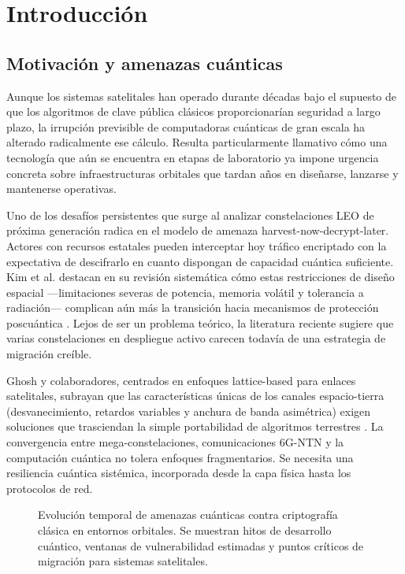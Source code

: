\section{Introducción}

\subsection{Motivación y amenazas cuánticas}

Aunque los sistemas satelitales han operado durante décadas bajo el supuesto de que los algoritmos de clave pública clásicos proporcionarían seguridad a largo plazo, la irrupción previsible de computadoras cuánticas de gran escala ha alterado radicalmente ese cálculo. Resulta particularmente llamativo cómo una tecnología que aún se encuentra en etapas de laboratorio ya impone urgencia concreta sobre infraestructuras orbitales que tardan años en diseñarse, lanzarse y mantenerse operativas.

Uno de los desafíos persistentes que surge al analizar constelaciones LEO de próxima generación radica en el modelo de amenaza harvest-now-decrypt-later. Actores con recursos estatales pueden interceptar hoy tráfico encriptado con la expectativa de descifrarlo en cuanto dispongan de capacidad cuántica suficiente. Kim et al. destacan en su revisión sistemática cómo estas restricciones de diseño espacial —limitaciones severas de potencia, memoria volátil y tolerancia a radiación— complican aún más la transición hacia mecanismos de protección poscuántica \cite{Kim2026}. Lejos de ser un problema teórico, la literatura reciente sugiere que varias constelaciones en despliegue activo carecen todavía de una estrategia de migración creíble.

Ghosh y colaboradores, centrados en enfoques lattice-based para enlaces satelitales, subrayan que las características únicas de los canales espacio-tierra (desvanecimiento, retardos variables y anchura de banda asimétrica) exigen soluciones que trasciendan la simple portabilidad de algoritmos terrestres \cite{Ghosh2026}. La convergencia entre mega-constelaciones, comunicaciones 6G-NTN y la computación cuántica no tolera enfoques fragmentarios. Se necesita una resiliencia cuántica sistémica, incorporada desde la capa física hasta los protocolos de red.

\begin{figure}[t]
\centering
\scalebox{0.5}{}
\caption{Evolución temporal de amenazas cuánticas contra criptografía clásica en entornos orbitales. Se muestran hitos de desarrollo cuántico, ventanas de vulnerabilidad estimadas y puntos críticos de migración para sistemas satelitales.}
\label{fig:evolucion_amenazas}
\end{figure}

